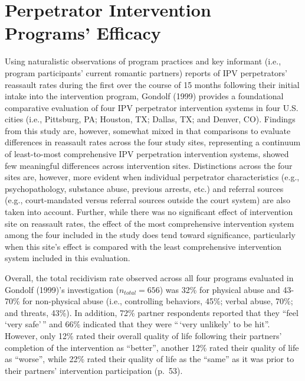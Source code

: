 \documentclass[11pt,]{tufte-book}
\begin{document}
\section{Perpetrator Intervention Programs'
Efficacy}\label{perpetrator-intervention-programs-efficacy}

Using naturalistic observations of program practices and key informant
(i.e., program participants' current romantic partners) reports of IPV
perpetrators' reassault rates during the first over the course of 15
months following their initial intake into the intervention program,
Gondolf (1999) provides a foundational comparative evaluation of four
IPV perpetrator intervention systems in four U.S. cities (i.e.,
Pittsburg, PA; Houston, TX; Dallas, TX; and Denver, CO). Findings from
this study are, however, somewhat mixed in that comparisons to evaluate
differences in reassault rates across the four study sites, representing
a continuum of least-to-most comprehensive IPV perpetration intervention
systems, showed few meaningful differences across intervention sites.
Distinctions across the four sites are, however, more evident when
individual perpetrator characteristics (e.g., psychopathology, substance
abuse, previous arrests, etc.) and referral sources (e.g.,
court-mandated versus referral sources outside the court system) are
also taken into account. Further, while there was no significant effect
of intervention site on reassault rates, the effect of the most
comprehensive intervention system among the four included in the study
does tend toward significance, particularly when this site's effect is
compared with the least comprehensive intervention system included in
this evaluation.

Overall, the total recidivism rate observed across all four programs
evaluated in Gondolf (1999)'s investigation (\(n_{total} = 656\)) was
32\% for physical abuse and 43-70\% for non-physical abuse (i.e.,
controlling behaviors, 45\%; verbal abuse, 70\%; and threats, 43\%). In
addition, 72\% partner respondents reported that they ``feel `very
safe'\,'' and 66\% indicated that they were ``\,`very unlikely' to be
hit''. However, only 12\% rated their overall quality of life following
their partners' completion of the intervention as ``better'', another
12\% rated their quality of life as ``worse'', while 22\% rated their
quality of life as the ``same'' as it was prior to their partners'
intervention participation (p.~53).
\end{document}
